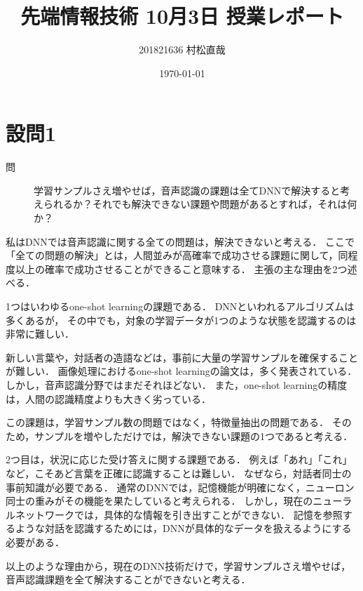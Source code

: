 \documentclass[pdflatex,ja=standard]{bxjsarticle}
\title{先端情報技術 10月3日 授業レポート}
\author{201821636 村松直哉}
\date{\today}
\begin{document}
\maketitle
%
%
\section{設問1}
\begin{description}
 \item[問] 学習サンプルさえ増やせば，音声認識の課題は全てDNNで解決すると考えられるか？それでも解決できない課題や問題があるとすれば，それは何か？
\end{description}

私はDNNでは音声認識に関する全ての問題は，解決できないと考える．
ここで「全ての問題の解決」とは，人間並みが高確率で成功させる課題に関して，同程度以上の確率で成功させることができること意味する．
主張の主な理由を2つ述べる．

\vspace{3mm}
1つはいわゆるone-shot learningの課題である．
DNNといわれるアルゴリズムは多くあるが，
その中でも，対象の学習データが1つのような状態を認識するのは非常に難しい．

新しい言葉や，対話者の造語などは，事前に大量の学習サンプルを確保することが難しい．
画像処理におけるone-shot learningの論文は，多く発表されている．
しかし，音声認識分野ではまだそれほどない．
また，one-shot learningの精度は，人間の認識精度よりも大きく劣っている．

この課題は，学習サンプル数の問題ではなく，特徴量抽出の問題である．
そのため，サンプルを増やしただけでは，解決できない課題の1つであると考える．

\vspace{3mm}
2つ目は，状況に応じた受け答えに関する課題である．
例えば「あれ」「これ」など，こそあど言葉を正確に認識することは難しい．
なぜなら，対話者同士の事前知識が必要である．
通常のDNNでは，記憶機能が明確になく，ニューロン同士の重みがその機能を果たしていると考えられる．
しかし，現在のニューラルネットワークでは，具体的な情報を引き出すことができない．
記憶を参照するような対話を認識するためには，DNNが具体的なデータを扱えるようにする必要がある．


以上のような理由から，現在のDNN技術だけで，学習サンプルさえ増やせば，音声認識課題を全て解決することができないと考える．
\end{document}
